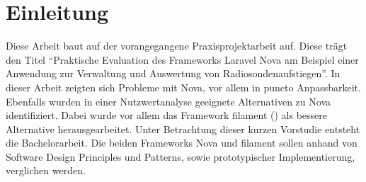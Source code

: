 \section{Einleitung}

Diese Arbeit baut auf der vorangegangene Praxisprojektarbeit auf.
Diese trägt den Titel \enquote{Praktische Evaluation des Frameworks Laravel Nova am Beispiel einer Anwendung zur Verwaltung und Auswertung von Radiosondenaufstiegen}.
In dieser Arbeit zeigten sich Probleme mit Nova, vor allem in puncto Anpassbarkeit.
Ebenfalls wurden in einer Nutzwertanalyse geeignete Alternativen zu Nova identifiziert.
Dabei wurde vor allem das Framework filament (\cite{filament}) als bessere Alternative herausgearbeitet.
Unter Betrachtung dieser kurzen Vorstudie entsteht die Bachelorarbeit.
Die beiden Frameworks Nova und filament sollen anhand von Software Design Principles und Patterns, sowie prototypischer Implementierung, verglichen werden.



